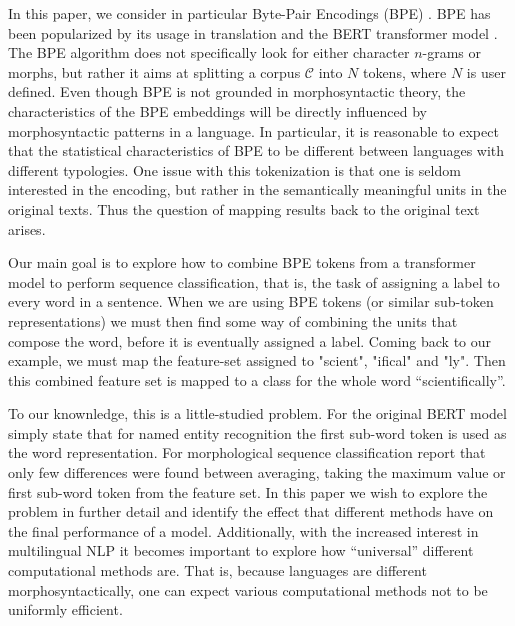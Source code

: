 \documentclass[11pt]{article}
\newcommand\citet{\newcite}
\newcommand\citep{\cite}
\begin{document}
    In this paper, we consider in particular
     Byte-Pair Encodings (BPE) \citep{sennrich2015neural}.
     BPE has been popularized by its usage in translation and the BERT transformer model \citep{devlin2018bert}.
     The BPE algorithm does not specifically look for either
     character $n$-grams or morphs, but rather it aims at splitting a
     corpus $\mathcal{C}$ into $N$ tokens, where $N$ is user defined.
    Even though BPE is not grounded in morphosyntactic theory, the
     characteristics of the BPE embeddings will be directly influenced
     by morphosyntactic patterns in a language. In particular, it is
     reasonable to expect that the statistical characteristics of BPE
     to be different between languages with different typologies.
        One issue with this tokenization is that one is seldom
     interested in the encoding, but rather in the semantically
     meaningful units in the original texts.  Thus the question of
     mapping results back to the original text arises.

                Our main goal is to explore how to combine BPE tokens
     from a transformer model to perform sequence classification, that
     is, the task of assigning a label to every word in a
     sentence. When we are using BPE tokens (or similar
     sub-token representations) we must then find some way of
     combining the units that compose the word, before it is
     eventually assigned a label. Coming back to our example, we must
     map the feature-set assigned to "scient", "ifical" and "ly". Then
     this combined feature set is mapped to a class for the whole word
     ``scientifically''.

                    	To our knownledge, this is a little-studied
     problem. For the original BERT model \citet{devlin2018bert}
     simply state that for named entity recognition the first sub-word
     token is used as the word representation.  For
     morphological sequence classification \citet{kondratyuk2019cross}
     report that only few differences were found between averaging,
     taking the maximum value or first sub-word token from the feature
     set.  In this paper we wish to explore the problem in further
     detail and identify the effect that different methods have on the
     final performance of a model.
                 Additionally, with the increased interest in
     multilingual NLP it becomes important to explore how
     ``universal'' different computational methods are.  That is,
     because languages are different morphosyntactically, one can
     expect various computational methods not to be uniformly
     efficient. 
\end{document}
